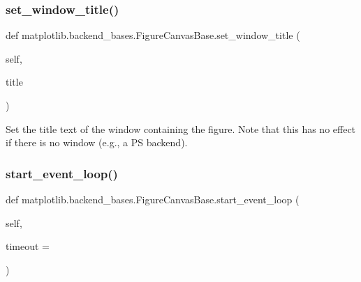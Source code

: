 \subsubsection{\texorpdfstring{set\+\_\+window\+\_\+title()}{set\_window\_title()}}
{\footnotesize\ttfamily def matplotlib.\+backend\+\_\+bases.\+Figure\+Canvas\+Base.\+set\+\_\+window\+\_\+title (\begin{DoxyParamCaption}\item[{}]{self,  }\item[{}]{title }\end{DoxyParamCaption})}

\begin{DoxyVerb}Set the title text of the window containing the figure.  Note that
this has no effect if there is no window (e.g., a PS backend).
\end{DoxyVerb}
 \mbox{\label{classmatplotlib_1_1backend__bases_1_1FigureCanvasBase_a8bffb5998719355fb08564ac8212753f}} 
\subsubsection{\texorpdfstring{start\+\_\+event\+\_\+loop()}{start\_event\_loop()}}
{\footnotesize\ttfamily def matplotlib.\+backend\+\_\+bases.\+Figure\+Canvas\+Base.\+start\+\_\+event\+\_\+loop (\begin{DoxyParamCaption}\item[{}]{self,  }\item[{}]{timeout = {} }\end{DoxyParamCaption})}

